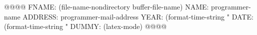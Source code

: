 











@@@@
FNAME: (file-name-nondirectory buffer-file-name)
NAME: programmer-name
ADDRESS: programmer-mail-address
YEAR: (format-time-string "%
DATE: (format-time-string "%
DUMMY: (latex-mode)
@@@@
